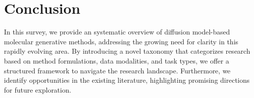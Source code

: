 \section{Conclusion}

In this survey, we provide an systematic overview of diffusion model-based molecular generative methods, addressing the growing need for clarity in this rapidly evolving area. By introducing a novel taxonomy that categorizes research based on method formulations, data modalities, and task types, we offer a structured framework to navigate the research landscape. Furthermore, we identify opportunities in the existing literature, highlighting promising directions for future exploration. 